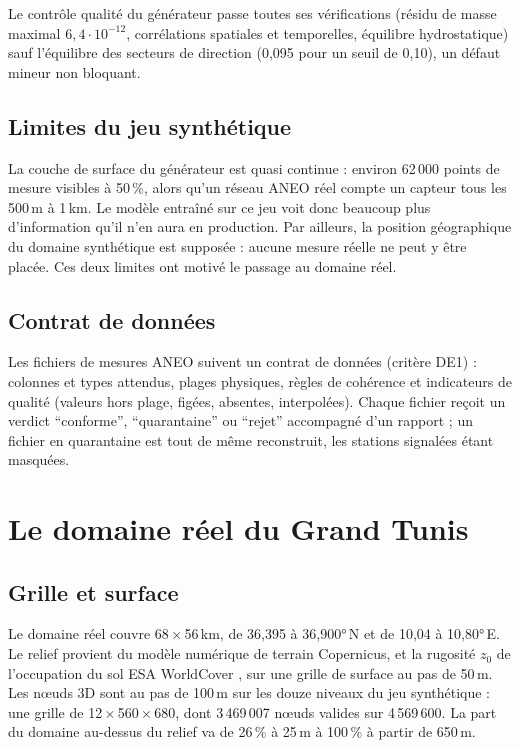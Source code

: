 Le contrôle qualité du générateur passe toutes ses vérifications (résidu de masse maximal
$6{,}4\cdot10^{-12}$, corrélations spatiales et temporelles, équilibre hydrostatique) sauf
l'équilibre des secteurs de direction (0,095 pour un seuil de 0,10), un défaut mineur non bloquant.

\subsection{Limites du jeu synthétique}
La couche de surface du générateur est quasi continue : environ 62\,000 points de mesure visibles
à 50\,\%, alors qu'un réseau ANEO réel compte un capteur tous les 500\,m à 1\,km. Le modèle entraîné
sur ce jeu voit donc beaucoup plus d'information qu'il n'en aura en production. Par ailleurs, la
position géographique du domaine synthétique est supposée : aucune mesure réelle ne peut y être
placée. Ces deux limites ont motivé le passage au domaine réel.

\subsection{Contrat de données}
Les fichiers de mesures ANEO suivent un contrat de données (critère DE1) : colonnes et types
attendus, plages physiques, règles de cohérence et indicateurs de qualité (valeurs hors plage,
figées, absentes, interpolées). Chaque fichier reçoit un verdict \enquote{conforme},
\enquote{quarantaine} ou \enquote{rejet} accompagné d'un rapport ; un fichier en quarantaine est
tout de même reconstruit, les stations signalées étant masquées.

\section{Le domaine réel du Grand Tunis}

\subsection{Grille et surface}
Le domaine réel couvre 68\,$\times$\,56\,km, de 36,395 à 36,900°\,N et de 10,04 à 10,80°\,E. Le
relief provient du modèle numérique de terrain Copernicus, et la rugosité $z_0$ de l'occupation du
sol ESA WorldCover \citep{zanaga2021}, sur une grille de surface au pas de 50\,m. Les nœuds 3D sont
au pas de 100\,m sur les douze niveaux du jeu synthétique : une grille de
12\,$\times$\,560\,$\times$\,680, dont 3\,469\,007 nœuds valides sur 4\,569\,600. La part du domaine
au-dessus du relief va de 26\,\% à 25\,m à 100\,\% à partir de 650\,m.

